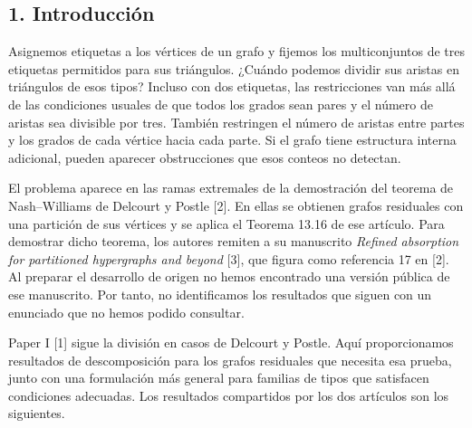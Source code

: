 \documentclass[spanish,11pt,a4paper]{article}
\begin{document}
\subsection{1. Introducción}\label{introducciuxf3n}

Asignemos etiquetas a los vértices de un grafo y fijemos los multiconjuntos de tres etiquetas permitidos para sus triángulos. ¿Cuándo podemos dividir sus aristas en triángulos de esos tipos? Incluso con dos etiquetas, las restricciones van más allá de las condiciones usuales de que todos los grados sean pares y el número de aristas sea divisible por tres. También restringen el número de aristas entre partes y los grados de cada vértice hacia cada parte. Si el grafo tiene estructura interna adicional, pueden aparecer obstrucciones que esos conteos no detectan.

El problema aparece en las ramas extremales de la demostración del teorema de Nash--Williams de Delcourt y Postle {[}2{]}. En ellas se obtienen grafos residuales con una partición de sus vértices y se aplica el Teorema 13.16 de ese artículo. Para demostrar dicho teorema, los autores remiten a su manuscrito \emph{Refined absorption for partitioned hypergraphs and beyond} {[}3{]}, que figura como referencia 17 en {[}2{]}. Al preparar el desarrollo de origen no hemos encontrado una versión pública de ese manuscrito. Por tanto, no identificamos los resultados que siguen con un enunciado que no hemos podido consultar.

Paper I {[}1{]} sigue la división en casos de Delcourt y Postle. Aquí proporcionamos resultados de descomposición para los grafos residuales que necesita esa prueba, junto con una formulación más general para familias de tipos que satisfacen condiciones adecuadas. Los resultados compartidos por los dos artículos son los siguientes.
\end{document}
